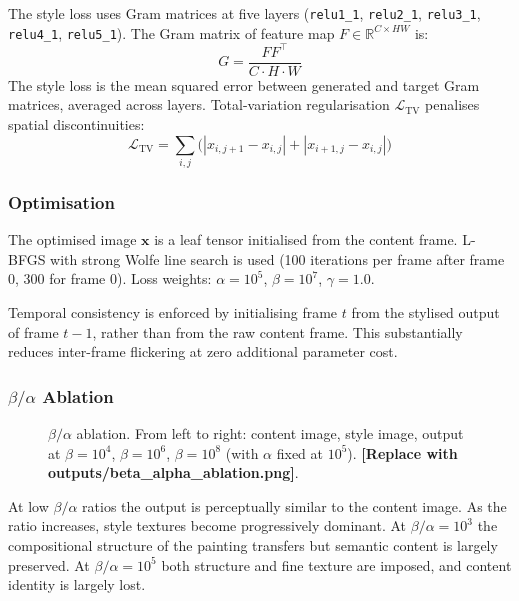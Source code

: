 The style loss uses Gram matrices at five layers
(\texttt{relu1\_1}, \texttt{relu2\_1}, \texttt{relu3\_1}, \texttt{relu4\_1},
\texttt{relu5\_1}). The Gram matrix of feature map $F \in \mathbb{R}^{C \times HW}$ is:
\begin{equation}
  G = \frac{F F^\top}{C \cdot H \cdot W}
\end{equation}
The style loss is the mean squared error between generated and target Gram matrices,
averaged across layers. Total-variation regularisation $\mathcal{L}_{\text{TV}}$ penalises
spatial discontinuities:
\begin{equation}
  \mathcal{L}_{\text{TV}} = \sum_{i,j}\bigl(|x_{i,j+1}-x_{i,j}| + |x_{i+1,j}-x_{i,j}|\bigr)
\end{equation}

\subsubsection{Optimisation}

The optimised image $\mathbf{x}$ is a leaf tensor initialised from the content frame.
L-BFGS with strong Wolfe line search is used (100 iterations per frame after frame 0,
300 for frame 0). Loss weights: $\alpha = 10^5$, $\beta = 10^7$, $\gamma = 1.0$.

Temporal consistency is enforced by initialising frame $t$ from the stylised output of
frame $t-1$, rather than from the raw content frame. This substantially reduces
inter-frame flickering at zero additional parameter cost.

\subsubsection{\texorpdfstring{$\beta/\alpha$}{beta/alpha} Ablation}

\begin{figure}[h]
\centering
\fbox{\rule{0pt}{4cm}\rule{\linewidth}{0pt}}
\caption{$\beta/\alpha$ ablation. From left to right: content image, style image,
output at $\beta = 10^4$, $\beta = 10^6$, $\beta = 10^8$ (with $\alpha$ fixed at $10^5$).
\textbf{[Replace with outputs/beta\_alpha\_ablation.png]}.}
\label{fig:ablation_ba}
\end{figure}

At low $\beta/\alpha$ ratios the output is perceptually similar to the content image.
As the ratio increases, style textures become progressively dominant. At $\beta/\alpha =
10^3$ the compositional structure of the painting transfers but semantic content is
largely preserved. At $\beta/\alpha = 10^5$ both structure and fine texture are imposed,
and content identity is largely lost.

